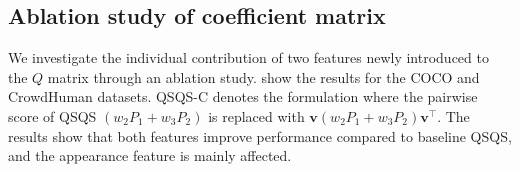\subsection{Ablation study of coefficient matrix}
We investigate the individual contribution of two features newly introduced to the $Q$ matrix through an ablation study.
 show the results for the COCO and CrowdHuman datasets.
QSQS-C denotes the formulation where the pairwise score of QSQS $(w_2P_1+w_3P_2)$ is replaced with $\bm{v}(w_2 P_1+w_3 P_2)\bm{v}^\top$.
The results show that both features improve performance compared to baseline QSQS, and the appearance feature is mainly affected.
\setlength\tabcolsep{0.75mm} 
